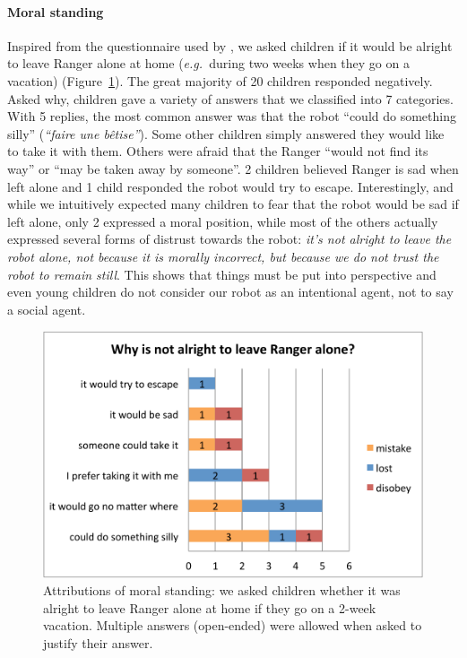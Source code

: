 \documentclass{sig-alternate}
\newcommand{\eg}{{\textit{e.g.~}}}
\begin{document}
\paragraph{Moral standing}

Inspired from the questionnaire used by \cite{kahn_jr._robotic_2006}, we asked
children if it would be alright to leave Ranger alone at home (\eg during two
weeks when they go on a vacation) (Figure~\ref{fig:domino-leave-alone}). The great
majority of 20 children responded negatively. Asked why, children gave a variety
of answers that we classified into 7 categories. With 5 replies, the most common answer was
that the robot ``could do something silly'' (\emph{``faire une bêtise''}). Some
other children simply answered they would like to take it with them. Others
were afraid that the Ranger ``would not find its way'' or ``may be taken
away by someone''. 2 children believed Ranger is sad when left alone and 1
child responded the robot would try to escape. Interestingly, and while we
intuitively expected many children to fear that the robot would be sad if
left alone, only 2 expressed a moral position, while most of the others
actually expressed several forms of distrust towards the robot: \emph{it's
not alright to leave the robot alone, not because it is morally incorrect,
but because we do not trust the robot to remain still}. This shows that things
must be put into perspective and even young children do not consider our robot
as an intentional agent, not to say a social agent.

\begin{figure}[!h]
    \centering 
    \includegraphics[width=0.9\linewidth]{domino-leave-why.pdf}
    \caption{\small Attributions of moral
        standing: we asked children whether it was alright to leave Ranger
        alone at home if they go on a 2-week vacation. Multiple answers
        (open-ended) were allowed when asked to justify their answer.}

    \label{fig:domino-leave-alone} 
\end{figure}		
\end{document}
